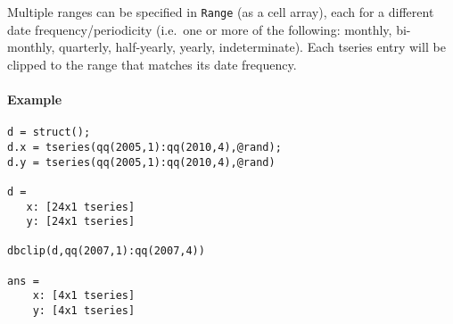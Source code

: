 Multiple ranges can be specified in \texttt{Range} (as a cell array),
each for a different date frequency/periodicity (i.e.~one or more of the
following: monthly, bi-monthly, quarterly, half-yearly, yearly,
indeterminate). Each tseries entry will be clipped to the range that
matches its date frequency.

\paragraph{Example}

\begin{verbatim}
d = struct();
d.x = tseries(qq(2005,1):qq(2010,4),@rand);
d.y = tseries(qq(2005,1):qq(2010,4),@rand)

d =
   x: [24x1 tseries]
   y: [24x1 tseries]

dbclip(d,qq(2007,1):qq(2007,4))

ans =
    x: [4x1 tseries]
    y: [4x1 tseries]
\end{verbatim}


